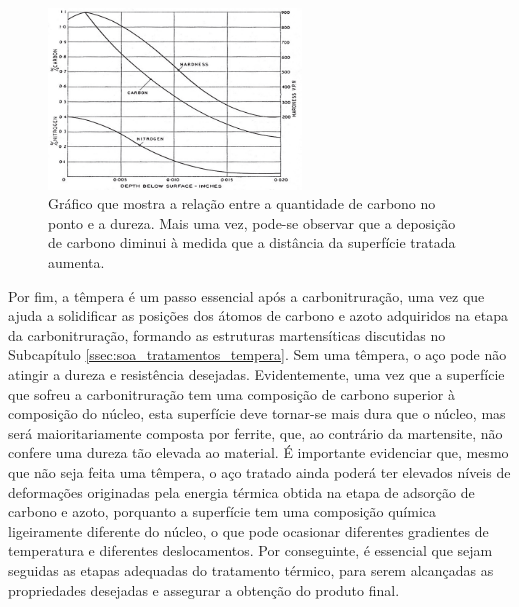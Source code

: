 \begin{figure}[htb]
    \centering
    \includegraphics[width = 0.6\textwidth]{Figures/Cap2/Carbon_Hardness_Carbonitriding.png}
    \caption[Relação entre carbono, azoto e dureza]%
    {Gráfico que mostra a relação entre a quantidade de carbono no ponto e a dureza\cite{Herring2011}. Mais uma vez, pode-se observar que a deposição de carbono diminui à medida que a distância da superfície tratada aumenta.}
    \label{fig:Carbon_Hardness_Carbonitriding}
\end{figure}
\newpage
\par
Por fim, a têmpera é um passo essencial após a carbonitruração, uma vez que ajuda a solidificar as posições dos átomos de carbono e azoto adquiridos na etapa da carbonitruração, formando as estruturas martensíticas discutidas no Subcapítulo \ref{ssec:soa_tratamentos_tempera}. Sem uma têmpera, o aço pode não atingir a dureza e resistência desejadas. Evidentemente, uma vez que a superfície que sofreu a carbonitruração tem uma composição de carbono superior à composição do núcleo, esta superfície deve tornar-se mais dura que o núcleo, mas será maioritariamente composta por ferrite, que, ao contrário da martensite, não confere uma dureza tão elevada ao material. É importante evidenciar que, mesmo que não seja feita uma têmpera, o aço tratado ainda poderá ter elevados níveis de deformações originadas pela energia térmica obtida na etapa de adsorção de carbono e azoto, porquanto a superfície tem uma composição química ligeiramente diferente do núcleo, o que pode ocasionar diferentes gradientes de temperatura e diferentes deslocamentos. Por conseguinte, é essencial que sejam seguidas as etapas adequadas do tratamento térmico, para serem alcançadas as propriedades desejadas e assegurar a obtenção do produto final.
